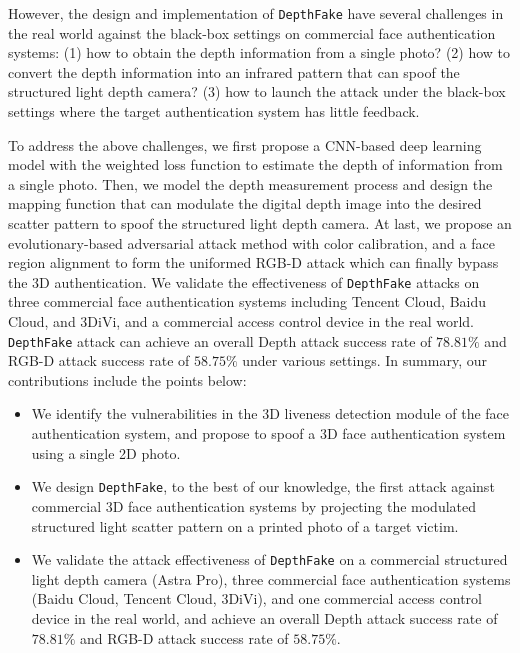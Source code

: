 However, the design and implementation of \texttt{DepthFake} have several challenges in the real world  against the black-box settings on commercial face authentication systems:
(1) how to obtain the depth information from a single photo?
(2) how to convert the depth information into an infrared pattern that can spoof the structured light depth camera?
(3) how to launch the attack under the black-box settings where the target authentication system has little feedback. 


To address the above challenges, we first propose a CNN-based deep learning model with the weighted loss function to estimate the depth of information from a single photo.
Then, we model the depth measurement process and design the mapping function that can modulate the digital depth image into the desired scatter pattern to spoof the structured light depth camera.
At last, we propose an evolutionary-based adversarial attack method with color calibration, and a face region alignment to form the uniformed RGB-D attack which can finally bypass the 3D authentication.
We validate the effectiveness of \texttt{DepthFake} attacks on three commercial face authentication systems including Tencent Cloud, Baidu Cloud, and 3DiVi, and a commercial access control device in the real world. \texttt{DepthFake} attack can achieve an overall Depth attack success rate of $78.81\%$ and RGB-D attack success rate of $58.75\%$ under various settings. In summary, our contributions include the points below:
\begin{itemize}	
	\item We identify the vulnerabilities in the 3D liveness detection module of the face authentication system, and propose to spoof a 3D  face authentication system using a single 2D photo.	
	\item We design \texttt{DepthFake},  to the best of our knowledge, the first attack against commercial 3D face authentication systems by projecting the modulated structured light scatter pattern on a printed photo of a target victim.	
	\item We validate the attack effectiveness of \texttt{DepthFake} on a commercial structured light depth camera (Astra Pro), three commercial face authentication systems (Baidu Cloud, Tencent Cloud, 3DiVi), and one commercial access control device in the real world, and achieve an overall Depth attack success rate of $78.81\%$ and RGB-D attack success rate of $58.75\%$.
\end{itemize}

